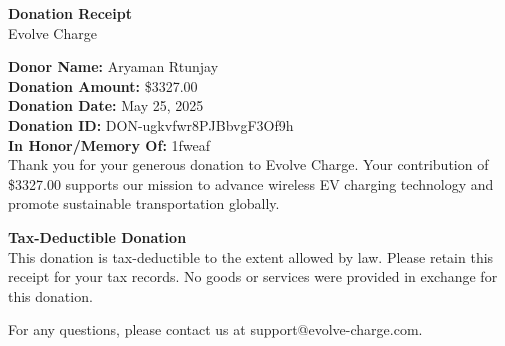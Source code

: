 \documentclass[a4paper,12pt]{article}
\begin{document}
\begin{center}
{\Large \textbf{Donation Receipt}}\\
\vspace{0.5cm}
Evolve Charge
\end{center}

\vspace{0.5cm}

\noindent
{\bf Donor Name:} Aryaman Rtunjay\\
{\bf Donation Amount:} \$3327.00\\
{\bf Donation Date:} May 25, 2025\\
{\bf Donation ID:} DON-ugkvfwr8PJBbvgF3Of9h\\
\noindent
{\bf In Honor/Memory Of:} 1fweaf\\

\vspace{0.5cm}
\noindent
Thank you for your generous donation to Evolve Charge. Your contribution of \$3327.00 supports our mission to advance wireless EV charging technology and promote sustainable transportation globally.

\vspace{0.5cm}

\noindent
{\bf Tax-Deductible Donation}\\
This donation is tax-deductible to the extent allowed by law. Please retain this receipt for your tax records. No goods or services were provided in exchange for this donation.

\vspace{0.5cm}

\noindent
For any questions, please contact us at support@evolve-charge.com.
\end{document}
